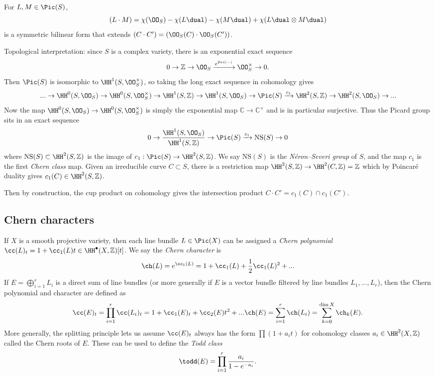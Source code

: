 \begin{theorem}
For \(L,M\in \Pic(S)\),
\[
    (L\cdot M) = \chi(\OO_S) - \chi(L\dual) - \chi(M\dual) +\chi(L\dual\otimes
    M\dual)
\]
is a symmetric bilinear form that extends \((C\cdot C') = (\OO_S(C)\cdot
\OO_S(C'))\).
\end{theorem}

Topological interpretation: since \(S\) is a complex variety, there is an
exponential exact sequence
\[0\to \mathbb{Z}\to \OO_S \xrightarrow{e^{2\pi i (-)}} \OO_S^\times \to 0.\]
Then \(\Pic(S)\) is isomorphic to \(\HH^1(S,\OO_S^\times)\), so taking the long
exact sequence in cohomology gives
\[...\to \HH^0(S,\OO_S)\to \HH^0(S,\OO_S^\times) \to \HH^1(S,\mathbb{Z})\to
\HH^1(S,\OO_S)\to \Pic(S)\xrightarrow{c_1} \HH^2(S,\mathbb{Z})\to
\HH^2(S,\OO_S)\to ...\]
Now the map \(\HH^0(S,\OO_S)\to\HH^0(S,\OO_S^\times)\) is simply the exponential
map \(\mathbb{C}\to \mathbb{C}^\times\) and is in particular surjective. Thus
the Picard group sits in an exact sequence
\[
0\to \frac{\HH^1(S,\OO_S)}{\HH^1(S,\mathbb{Z})} \to \Pic(S) \xrightarrow{c_1}
\text{NS}(S)\to 0
\]
where \(\text{NS}(S)\subset \HH^2(S,\mathbb{Z})\) is the image of
\(c_1:\Pic(S)\to \HH^2(S,\mathbb{Z})\). We say \(\text{NS}(S)\) is the
\emph{N\'eron--Severi group} of \(S\), and the map \(c_1\) is the first
\emph{Chern class} map. Given an irreducible curve \(C\subset S\), there is a
restriction map \(\HH^2(S,\mathbb{Z})\to \HH^2(C,\mathbb{Z})=\mathbb{Z}\) which
by Poincar\'e duality gives \(c_1(C)\in \HH^2(S,\mathbb{Z})\).

Then by construction, the cup product on cohomology gives the intersection product \(C\cdot
C'=c_1(C)\cap c_1(C')\).

\subsection{Chern characters} If \(X\) is a smooth projective variety, then each
line bundle \(L\in \Pic (X)\) can be assigned a \emph{Chern polynomial}
\(\cc(L)_t = 1+\cc_1(L)t \in \HH^\bullet(X,\mathbb{Z})[t]\). We say the
\emph{Chern character} is \[\ch(L)=e^{\cc_1(L)} =
1+\cc_1(L)+\frac{1}{2}\cc_1(L)^2+...\]
If \(E=\bigoplus_{i=1}^rL_i\) is a direct sum of line bundles (or more generally
if \(E\) is a vector bundle filtered by line bundles \(L_1,...,L_r\)), then the
Chern polynomial and character are defined as
\[
\cc(E)_t = \prod_{i=1}^r\cc(L_i)_t = 1 + \cc_1(E)_t + \cc_2(E)t^2 + ... \\
\ch(E) = \sum_{i=1}^r\ch(L_i) = \sum_{k=0}^{\dim X} \ch_k(E).
\]
More generally, the splitting principle lets us assume \(\cc(E)_t\) always has
the form \(\prod(1+a_it)\) for cohomology classes \(a_i\in \HH^2(X,\mathbb{Z})\)
called the Chern roots of \(E\). These can be used to define the \emph{Todd
class}
\[
\todd(E)= \prod_{i=1}^r \frac{a_i}{1-e^{-a_i}}.
\]


